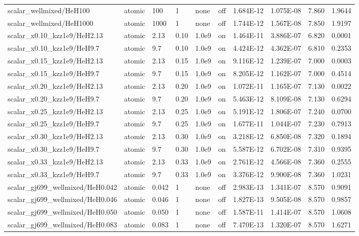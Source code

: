 \documentclass[11pt]{my_memo}
\begin{document}
\begin{longtable}{@{}l >{\raggedright\arraybackslash}p{1.5cm} l l l l l l r r@{}}
scalar\_wellmixed/HeH100 & atomic & 100 & 1 & none & off & 1.684E-12 & 1.075E-08 & 7.860 & 1.9644\\
scalar\_wellmixed/HeH1000 & atomic & 1000 & 1 & none & off & 1.744E-12 & 1.567E-08 & 7.850 & 1.9197\\
scalar\_x0.10\_kzz1e9/HeH2.13 & atomic & 2.13 & 0.10 & 1.0e9 & on & 1.464E-11 & 3.886E-07 & 6.820 & 0.0001\\
scalar\_x0.10\_kzz1e9/HeH9.7 & atomic & 9.7 & 0.10 & 1.0e9 & on & 4.424E-12 & 4.362E-07 & 6.810 & 0.2353\\
scalar\_x0.15\_kzz1e9/HeH2.13 & atomic & 2.13 & 0.15 & 1.0e9 & on & 9.116E-12 & 1.239E-07 & 7.000 & 0.0003\\
scalar\_x0.15\_kzz1e9/HeH9.7 & atomic & 9.7 & 0.15 & 1.0e9 & on & 8.205E-12 & 1.162E-07 & 7.000 & 0.4514\\
scalar\_x0.20\_kzz1e9/HeH2.13 & atomic & 2.13 & 0.20 & 1.0e9 & on & 1.072E-11 & 1.165E-07 & 7.130 & 0.0022\\
scalar\_x0.20\_kzz1e9/HeH9.7 & atomic & 9.7 & 0.20 & 1.0e9 & on & 5.463E-12 & 8.109E-08 & 7.130 & 0.6294\\
scalar\_x0.25\_kzz1e9/HeH2.13 & atomic & 2.13 & 0.25 & 1.0e9 & on & 5.191E-12 & 1.806E-07 & 7.240 & 0.0700\\
scalar\_x0.25\_kzz1e9/HeH9.7 & atomic & 9.7 & 0.25 & 1.0e9 & on & 1.677E-11 & 1.044E-07 & 7.230 & 0.7913\\
scalar\_x0.30\_kzz1e9/HeH2.13 & atomic & 2.13 & 0.30 & 1.0e9 & on & 3.218E-12 & 6.850E-08 & 7.320 & 0.1894\\
scalar\_x0.30\_kzz1e9/HeH9.7 & atomic & 9.7 & 0.30 & 1.0e9 & on & 5.587E-12 & 6.702E-08 & 7.310 & 0.9395\\
scalar\_x0.33\_kzz1e9/HeH2.13 & atomic & 2.13 & 0.33 & 1.0e9 & on & 2.761E-12 & 4.566E-08 & 7.360 & 0.2555\\
scalar\_x0.33\_kzz1e9/HeH9.7 & atomic & 9.7 & 0.33 & 1.0e9 & on & 3.376E-12 & 9.900E-08 & 7.360 & 1.0231\\
scalar\_gj699\_wellmixed/HeH0.042 & atomic & 0.042 & 1 & none & off & 2.983E-13 & 1.341E-07 & 8.570 & 0.9091\\
scalar\_gj699\_wellmixed/HeH0.046 & atomic & 0.046 & 1 & none & off & 1.827E-13 & 9.505E-08 & 8.570 & 0.9857\\
scalar\_gj699\_wellmixed/HeH0.050 & atomic & 0.050 & 1 & none & off & 1.587E-11 & 1.414E-07 & 8.570 & 1.0608\\
scalar\_gj699\_wellmixed/HeH0.083 & atomic & 0.083 & 1 & none & off & 7.470E-13 & 1.320E-07 & 8.570 & 1.6271\\

\end{longtable}
\end{document}
